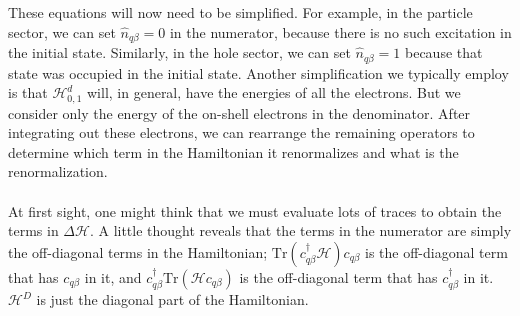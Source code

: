 \documentclass[twoside,11pt]{report}
\numberwithin{equation}{section}
\begin{document}
These equations will now need to be simplified. For example, in the particle sector, we can set \(\hat n_{q\beta}=0\) in the numerator, because there is no such excitation in the initial state. Similarly, in  the hole sector, we can set \(\hat n_{q\beta}=1\) because that state was occupied in the initial state. Another simplification we typically employ is that \(\mathcal{H}^d_{0,1}\) will, in general, have the energies of all the electrons. But we consider only the energy of the on-shell electrons in the denominator. After integrating out these electrons, we can rearrange the remaining operators to determine which term in the Hamiltonian it renormalizes and what is the renormalization.
\\\\At first sight, one might think that we must evaluate lots of traces to obtain the terms in \(\Delta \mathcal{H}\). A little thought reveals that the terms in the numerator are simply the off-diagonal terms in the Hamiltonian; \(\text{Tr}\left(c^\dagger_{q\beta}\mathcal{H} \right)c_{q\beta}\) is the off-diagonal term that has \(c_{q\beta}\) in it, and \(c_{q\beta}^\dagger \text{Tr}\left(\mathcal{H} c_{q\beta}\right)\) is the off-diagonal term that has \(c^\dagger_{q\beta}\) in it. \(\mathcal{H}^D\) is just the diagonal part of the Hamiltonian.
\end{document}
